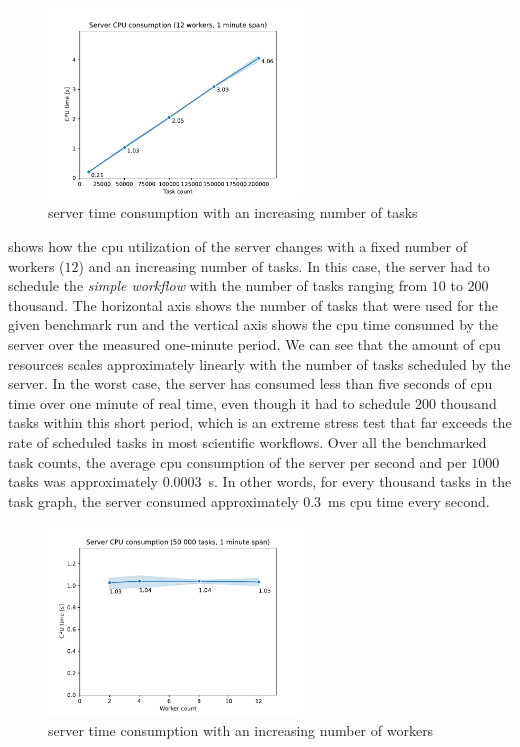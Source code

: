 \begin{figure}[h]
	\centering
	\includegraphics[width=0.6\textwidth]{imgs/hq/charts/server-utilization-tasks}
	\caption{\hyperqueue{} server  time consumption with an increasing number
	of tasks}
	\label{fig:hq-server-cpu-consumption-tasks}
\end{figure}

 shows how the \gls{cpu} utilization of the
server changes with a fixed number of workers ($12$) and an increasing number of
tasks. In this case, the server had to schedule the \emph{simple workflow} with the number of tasks
ranging from $10$ to $200$ thousand. The horizontal axis shows
the number of tasks that were used for the given benchmark run and the vertical axis shows the
\gls{cpu} time consumed by the server over the measured one-minute period. We can see that the
amount of \gls{cpu} resources scales approximately linearly with the number of tasks
scheduled by the server. In the worst case, the server has consumed less than five seconds of
\gls{cpu} time over one minute of real time, even though it had to schedule
$200$ thousand tasks within this short period, which is an extreme stress test
that far exceeds the rate of scheduled tasks in most scientific workflows. Over all the benchmarked
task counts, the average \gls{cpu} consumption of the server per second and per
$1000$ tasks was approximately \SI{0.0003}{\second}. In other words, for every
thousand tasks in the task graph, the server consumed approximately \SI{0.3}{\milli\second}
\gls{cpu} time every second.

\begin{figure}[h]
	\centering
	\includegraphics[width=0.6\textwidth]{imgs/hq/charts/server-utilization-workers}
	\caption{\hyperqueue{} server  time consumption with an increasing number
	of workers}
	\label{fig:hq-server-cpu-consumption-workers}
\end{figure}

